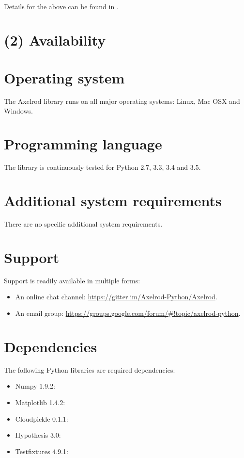 \documentclass{jors}
\begin{document}
Details for the above can be found in \cite{Harper2015}.

\section*{(2) Availability}\label{sec:availability}

\section*{Operating system}

The Axelrod library runs on all major operating systems: Linux, Mac OSX and
Windows.

\section*{Programming language}

The library is continuously tested for Python 2.7, 3.3, 3.4 and 3.5.

\section*{Additional system requirements}

There are no specific additional system requirements.

\section*{Support}

Support is readily available in multiple forms:

\begin{itemize}[noitemsep,topsep=0pt]
    \item An online chat channel:
        \url{https://gitter.im/Axelrod-Python/Axelrod}.
    \item An  email group:
        \url{https://groups.google.com/forum/#!topic/axelrod-python}.
\end{itemize}

\section*{Dependencies}

The following Python libraries are required dependencies:

\begin{multicols}{3}
    \begin{itemize}[noitemsep,topsep=0pt]
        \item Numpy 1.9.2:
        \item Matplotlib 1.4.2:
        \item Cloudpickle  0.1.1:
        \item Hypothesis  3.0:
        \item Testfixtures  4.9.1:
    \end{itemize}
\end{multicols}
\end{document}

